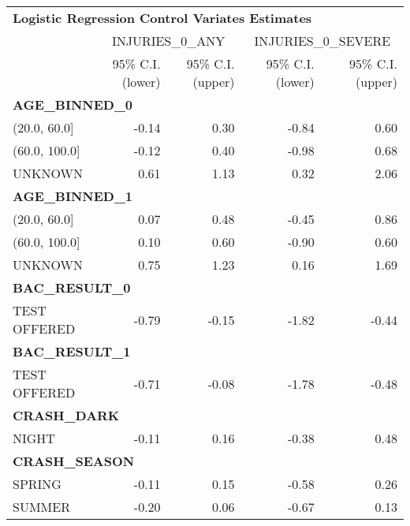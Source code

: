 \begin{tabular}{lrrrr}
\toprule
\multicolumn{5}{l}{\normalsize\textbf{Logistic Regression Control Variates Estimates}}\\\addlinespace
{} & \multicolumn{2}{c}{INJURIES\_0\_ANY} & \multicolumn{2}{c}{INJURIES\_0\_SEVERE} \\
\cmidrule(lr){1-1}
\cmidrule(lr){2-3}
\cmidrule(l){4-5}
{} & 95\% C.I. (lower) & 95\% C.I. (upper) &  95\% C.I. (lower) & 95\% C.I. (upper) \\
\midrule
\multicolumn{5}{l}{\textbf{AGE\_BINNED\_0}}\\\addlinespace
(20.0, 60.0]  &            -0.14 &             0.30 &             -0.84 &             0.60 \\
(60.0, 100.0] &            -0.12 &             0.40 &             -0.98 &             0.68 \\
UNKNOWN       &             0.61 &             1.13 &              0.32 &             2.06 \\
\midrule
\multicolumn{5}{l}{\textbf{AGE\_BINNED\_1}}\\\addlinespace
(20.0, 60.0]  &             0.07 &             0.48 &             -0.45 &             0.86 \\
(60.0, 100.0] &             0.10 &             0.60 &             -0.90 &             0.60 \\
UNKNOWN       &             0.75 &             1.23 &              0.16 &             1.69 \\
\midrule
\multicolumn{5}{l}{\textbf{BAC\_RESULT\_0}}\\\addlinespace
TEST OFFERED &            -0.79 &            -0.15 &             -1.82 &            -0.44 \\
\midrule
\multicolumn{5}{l}{\textbf{BAC\_RESULT\_1}}\\\addlinespace
TEST OFFERED &            -0.71 &            -0.08 &             -1.78 &            -0.48 \\
\midrule
\multicolumn{5}{l}{\textbf{CRASH\_DARK}}\\\addlinespace
NIGHT &            -0.11 &             0.16 &             -0.38 &             0.48 \\
\midrule
\multicolumn{5}{l}{\textbf{CRASH\_SEASON}}\\\addlinespace
SPRING &            -0.11 &             0.15 &             -0.58 &             0.26 \\
SUMMER &            -0.20 &             0.06 &             -0.67 &             0.13 \\

\end{tabular}

